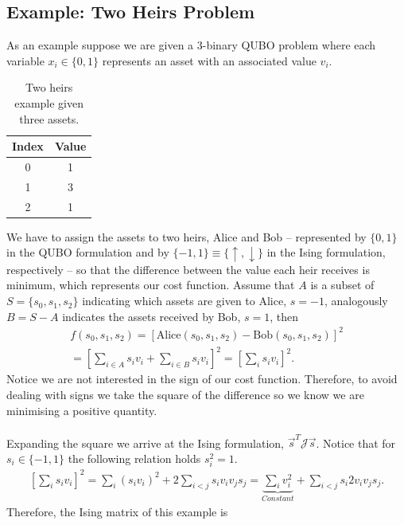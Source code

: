 \subsection{Example: Two Heirs Problem}
 As an example suppose we are given a 3-binary QUBO problem where each variable $x_{i} \in \{0,1\}$ represents an asset with an associated value $v_{i}$.
\begin{table}[H]
\centering
\label{tab:Assets}
\begin{tabular}{ |c || c| }
  \hline			
  \textbf{Index} & \textbf{Value}  \\
    \hline		
   0 & 1\\
       \hline		
   1 & 3\\
       \hline		
   2 & 1\\
        \hline	
\end{tabular}
\caption{Two heirs example given three assets.}
\end{table}
We have to assign the assets to two heirs, Alice and Bob -- represented by $\{0,1\}$ in the QUBO formulation and by $\{-1,1\}\equiv \{\uparrow, \downarrow\}$ in the Ising formulation, respectively -- so that the difference between the value each heir receives is minimum, which represents our cost function. Assume that $A$ is a subset of $S = \{s_{0},s_{1},s_{2}\}$ indicating which assets are given to Alice, $s=-1$, analogously  $B = S - A$ indicates the assets received by Bob, $s=1$, then
\begin{align} 
    f(s_{0}, s_{1}, s_{2}) = \left[\text{Alice}(s_{0}, s_{1}, s_{2}) - \text{Bob}(s_{0}, s_{1}, s_{2})\right]^{2} \\
    = \left[\sum_{i\in A}s_{i}v_{i} + \sum_{i\in B}s_{i}v_{i}\right]^{2} = \left[\sum_{i}s_{i}v_{i}\right]^{2}.
\end{align}
Notice we are not interested in the sign of our cost function. Therefore, to avoid dealing with signs we take the square of the difference so we know we are minimising a positive quantity.\\\\
Expanding the square we arrive at the Ising formulation, $\vec{s}^{T}\mathcal{J}\vec{s}$. Notice that for $s_{i} \in \{-1,1\}$ the following relation holds $s_{i}^{2}=1$. 
\begin{align}
    \left[\sum_{i}s_{i}v_{i}\right]^{2} = \sum_{i}\left(s_{i}v_{i}\right)^{2} + 2\sum_{i<j}s_{i}v_{i}v_{j}s_{j} = \underbrace{\sum_{i}v_{i}^{2}}_{Constant} + \sum_{i<j}s_{i}2v_{i}v_{j}s_{j}.
\end{align}
Therefore, the Ising matrix of this example is
